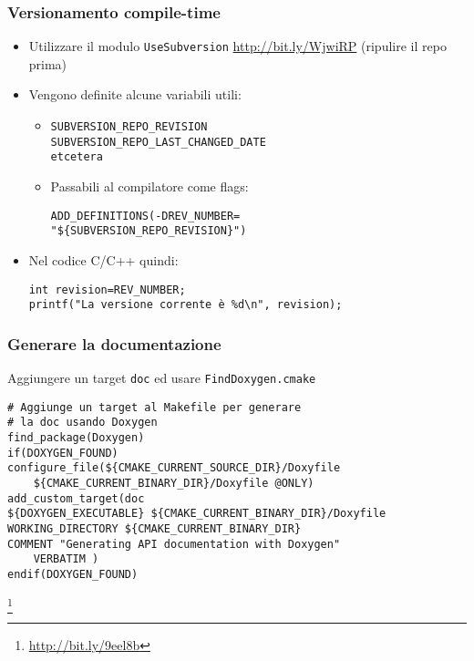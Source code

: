 \documentclass[12pt] {beamer}
\begin{document}
\begin{frame}[fragile]
 \frametitle{Versionamento compile-time}
\begin{itemize}
 \item Utilizzare il modulo \texttt{UseSubversion} \url{http://bit.ly/WjwiRP} (ripulire il repo prima)
\item Vengono definite alcune variabili utili:
\begin{itemize}
\item 

\begin{small}
\begin{verbatim}
SUBVERSION_REPO_REVISION
SUBVERSION_REPO_LAST_CHANGED_DATE
etcetera
\end{verbatim}
\end{small}
\item Passabili al compilatore come flags:
\begin{small}
\begin{verbatim}
ADD_DEFINITIONS(-DREV_NUMBER=
"${SUBVERSION_REPO_REVISION}")
\end{verbatim}
\end{small}
\end{itemize}
\item Nel codice C/C++ quindi:
\begin{verbatim}
int revision=REV_NUMBER;
printf("La versione corrente è %d\n", revision);
\end{verbatim}
\end{itemize}
\end{frame}

\begin{frame}[fragile]
 \frametitle{Generare la documentazione}
Aggiungere un target \texttt{doc} ed usare \texttt{FindDoxygen.cmake}
\begin{footnotesize}
\begin{verbatim}
# Aggiunge un target al Makefile per generare 
# la doc usando Doxygen
find_package(Doxygen)
if(DOXYGEN_FOUND)
configure_file(${CMAKE_CURRENT_SOURCE_DIR}/Doxyfile 
    ${CMAKE_CURRENT_BINARY_DIR}/Doxyfile @ONLY)
add_custom_target(doc
${DOXYGEN_EXECUTABLE} ${CMAKE_CURRENT_BINARY_DIR}/Doxyfile
WORKING_DIRECTORY ${CMAKE_CURRENT_BINARY_DIR}
COMMENT "Generating API documentation with Doxygen" 
    VERBATIM )
endif(DOXYGEN_FOUND)
\end{verbatim}
\end{footnotesize}
\footnote{\url{http://bit.ly/9eel8b}}
\end{frame}
\end{document}
